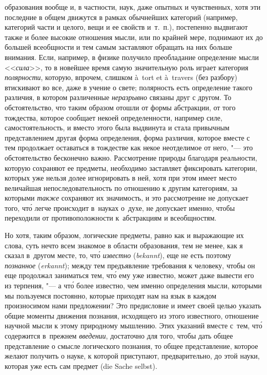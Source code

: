 образования вообще и, в частности, наук, даже опытных и чувственных, хотя эти
последние в общем движутся в рамках обычнейших категорий (например, категорий
части и целого, вещи и ее свойств и~т.~п.), постепенно выдвигают также и более
высокие отношения мысли, или по крайней мере, поднимают их до большей
всеобщности и тем самым заставляют обращать на них больше внимания. Если,
например, в физике получило преобладание определение мысли <<{\em сила}>>, то в
новейшее время самую значительную роль играет категория {\em полярности},
которую, впрочем, слишком à~tort et à~travers (без разбору) втискивают во все,
даже в учение о свете; полярность есть определение такого различия, в
котором различенные {\em неразрывно} связаны друг с другом. То обстоятельство,
что таким образом отошли от формы абстракции, от того тождества, которое
сообщает некоей определенности, например силе, самостоятельность, и вместо
этого была выдвинута и стала привычным представлением другая форма определения,
форма различия, которое вместе с тем продолжает оставаться в тождестве как
некое неотделимое от него, "--- это обстоятельство бесконечно важно.
Рассмотрение природы благодаря реальности, которую сохраняют ее предметы,
необходимо заставляет фиксировать категории, которых уже нельзя долее
игнорировать в ней, хотя при этом имеет место величайшая непоследовательность
по отношению к другим категориям, за которыми {\em также} сохраняют их
значимость, и это рассмотрение не допускает того, чт\'{о} легче происходит
в~науках о~духе, не допускает именно, чтобы переходили от противоположности
к~абстракциям и всеобщностям.

Но хотя, таким образом, логические предметы, равно как и выражающие их слова,
суть нечто всем знакомое в области образования, тем не менее, как я сказал
в~другом месте, то,
чт\'{о} {\em известно} ({\em bekannt}), еще не есть поэтому {\em познанное}
({\em erkannt}); между тем предъявление требования к человеку, чтобы он еще
продолжал заниматься тем, чт\'{о} ему уже известно, может даже вывести его из
терпения, "--- а чт\'{о} более известно, чем именно определения мысли, которыми
мы пользуемся постоянно, которые приходят нам на язык в каждом произносимом
нами предложении? Это предисловие и имеет своей целью указать общие моменты
движения познания, исходящего из этого известного, отношение научной мысли к
этому природному мышлению. Этих указаний вместе с~тем, чт\'{о} содержится
в~прежнем {\em введении}, достаточно для того, чтобы дать общее представление о
смысле логического познания, то общее представление, которое желают получить о
науке, к которой приступают, предварительно, до этой науки, которая уже есть
сам предмет (die Sache selbst).

